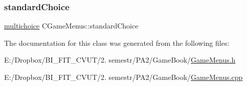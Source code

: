 \subsubsection{\texorpdfstring{standard\+Choice}{standardChoice}}
{\footnotesize\ttfamily \mbox{\hyperlink{_game_menus_8h_acdb545ed67596d0840e35ed209fecbe9}{multichoice}} C\+Game\+Menus\+::standard\+Choice}



The documentation for this class was generated from the following files\+:\begin{DoxyCompactItemize}
\item 
E\+:/\+Dropbox/\+B\+I\+\_\+\+F\+I\+T\+\_\+\+C\+V\+U\+T/2. semestr/\+P\+A2/\+Game\+Book/\mbox{\hyperlink{_game_menus_8h}{Game\+Menus.\+h}}\item 
E\+:/\+Dropbox/\+B\+I\+\_\+\+F\+I\+T\+\_\+\+C\+V\+U\+T/2. semestr/\+P\+A2/\+Game\+Book/\mbox{\hyperlink{_game_menus_8cpp}{Game\+Menus.\+cpp}}\end{DoxyCompactItemize}
